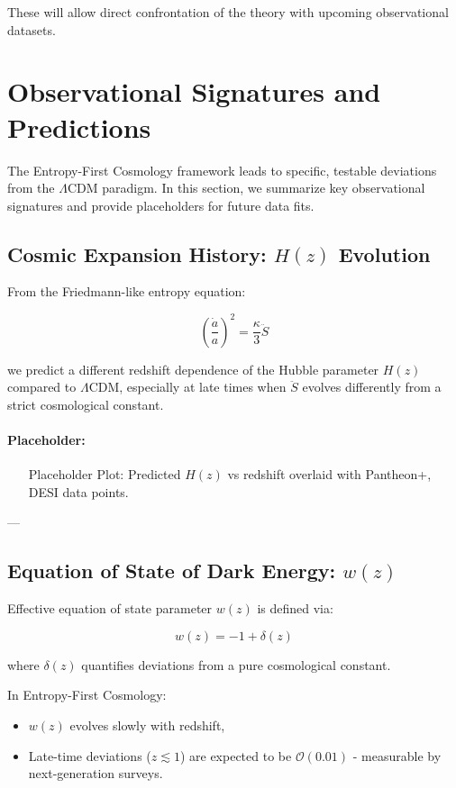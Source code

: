 \documentclass{article}
\begin{document}
These will allow direct confrontation of the theory with upcoming observational datasets.

\section{Observational Signatures and Predictions}

The Entropy-First Cosmology framework leads to specific, testable deviations from the $\Lambda$CDM paradigm.
In this section, we summarize key observational signatures and provide placeholders for future data fits.

\subsection{Cosmic Expansion History: $H(z)$ Evolution}

From the Friedmann-like entropy equation:

\[
\left( \frac{\dot{a}}{a} \right)^2 = \frac{\kappa}{3} \ddot{S}
\]

we predict a different redshift dependence of the Hubble parameter $H(z)$ compared to $\Lambda$CDM, especially at late times when $\ddot{S}$ evolves differently from a strict cosmological constant.

\paragraph{Placeholder:}

\begin{itemize}
    \item [Placeholder] Plot: Predicted $H(z)$ vs redshift overlaid with Pantheon+, DESI data points.
\end{itemize}

---

\subsection{Equation of State of Dark Energy: $w(z)$}

Effective equation of state parameter $w(z)$ is defined via:

\[
w(z) = -1 + \delta(z)
\]

where $\delta(z)$ quantifies deviations from a pure cosmological constant.

In Entropy-First Cosmology:
\begin{itemize}
    \item $w(z)$ evolves slowly with redshift,
    \item Late-time deviations ($z \lesssim 1$) are expected to be $\mathcal{O}(0.01)$ - measurable by next-generation surveys.
\end{itemize}
\end{document}
